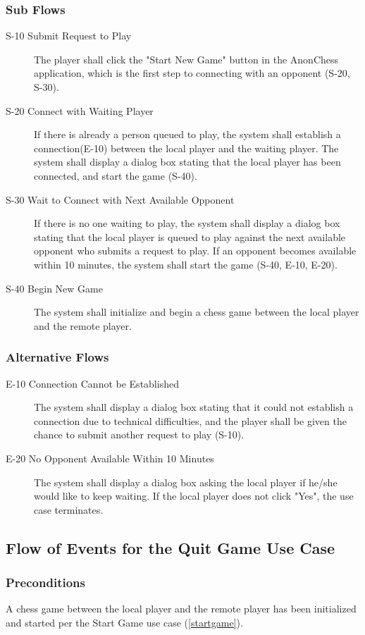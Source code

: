 \subsubsection{Sub Flows}
\begin{description}
\item[S-10 Submit Request to Play] The player shall click the "Start New Game" button in the AnonChess application, which is the first step to connecting with an opponent (S-20, S-30).
\item[S-20 Connect with Waiting Player] If there is already a person queued to play, the system shall establish a connection(E-10) between the local player and the waiting player.  The system shall display a dialog box stating that the local player has been connected, and start the game (S-40).
\item[S-30 Wait to Connect with Next Available Opponent] If there is no one waiting to play, the system shall display a dialog box stating that the local player is queued to play against the next available opponent who submits a request to play.  If an opponent becomes available within 10 minutes, the system shall start the game (S-40, E-10, E-20).
\item[S-40 Begin New Game] The system shall initialize and begin a chess game between the local player and the remote player.
\end{description}
\subsubsection{Alternative Flows}
\begin{description}
\item[E-10 Connection Cannot be Established] The system shall display a dialog box stating that it could not establish a connection due to technical difficulties, and the player shall be given the chance to submit another request to play (S-10).
\item[E-20 No Opponent Available Within 10 Minutes] The system shall display a dialog box asking the local player if he/she would like to keep waiting.  If the local player does not click "Yes", the use case terminates.
\end{description}


\subsection{ Flow of Events for the Quit Game Use Case }
\label{quitgame}
\subsubsection{Preconditions}
  A chess game between the local player and the remote player has been initialized and started per the Start Game use case (\ref{startgame}). 
